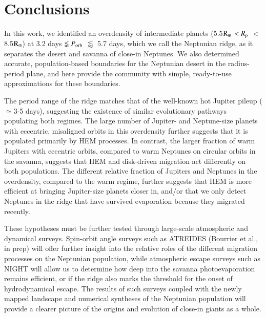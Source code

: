 \documentclass[]{aa}
\begin{document}
\section{Conclusions}
\label{sec:conclusion}

In this work, we identified an overdensity of intermediate planets (5.5$\rm R_{\oplus}$ $<R_{\rm p}$ $<$ 8.5$\rm R_{\oplus}$) at  3.2 days $ \lessapprox P_{\rm orb}$ $\lessapprox$ 5.7 days, which we call the Neptunian ridge, as it separates the desert and savanna of close-in Neptunes. We also determined accurate, population-based boundaries for the Neptunian desert in the radius-period plane, and here provide the community with simple, ready-to-use approximations for these boundaries. 

The period range of the ridge matches that of the well-known hot Jupiter pileup ($\simeq$3-5 days), suggesting the existence of similar evolutionary pathways populating both regimes. The large number of Jupiter- and Neptune-size planets with eccentric, misaligned orbits in this overdensity further suggests that it is populated primarily by HEM processes. In contrast, the larger fraction of warm Jupiters with eccentric orbits, compared to warm Neptunes on circular orbits in the savanna, suggests that HEM and disk-driven migration act differently on both populations. The different relative fraction of Jupiters and Neptunes in the overdensity, compared to the warm regime, further suggests that HEM is more efficient at bringing Jupiter-size planets closer in, and/or that we only detect Neptunes in the ridge that have survived evaporation because they migrated recently.

These hypotheses must be further tested through large-scale atmospheric and dynamical surveys. Spin-orbit angle surveys such as ATREIDES (Bourrier et al., in prep) will offer further insight into the relative roles of the different migration processes on the Neptunian population, while atmospheric escape surveys such as NIGHT \citep{2024MNRAS.527.4467F} will allow us to determine how deep into the savanna photoevaporation remains efficient, or if the ridge also marks the threshold for the onset of hydrodynamical escape. The results of such surveys coupled with the newly mapped landscape and numerical syntheses of the Neptunian population will provide a clearer picture of the origins and evolution of close-in giants as a whole. 
\end{document}
